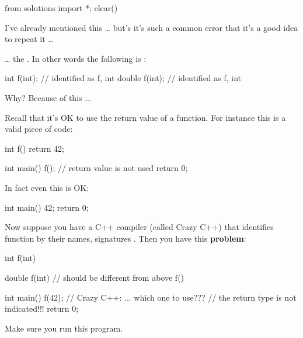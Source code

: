 \begin{python0}
from solutions import *; clear()
\end{python0}

I've already mentioned this \ldots{} but's it's such a common error that it's a good idea to repeat it \ldots{}

\ldots{} the . In other words the following is :

\begin{consolethree}[escapeinside=||]
int f(int);    // identified as f, int
double f(int); // identified as f, int
\end{consolethree}

Why? Because of this ...

Recall that it's OK \textit{} to use the return value of a function. For instance this is a valid piece of code:

\begin{consolethree}[escapeinside=||]
int f()
{
    return 42;
}

int main()
{
    f(); // return value is not used
    return 0;
}
\end{consolethree}

In fact even this is OK:

\begin{consolethree}[escapeinside=||]
int main()
{
    42;
    return 0;
}
\end{consolethree}

Now suppose you have a C++ compiler (called Crazy C++) that identifies function by their names, signatures . Then you have this \textbf{problem}:

\begin{consolethree}[escapeinside=||]
int f(int)
{}

double f(int) // should be different from above f()
{}

int main()
{
    f(42); // Crazy C++: ... which one to use???
           // the return type is not indicated!!!
    return 0;
}
\end{consolethree}

Make sure you run this program.


